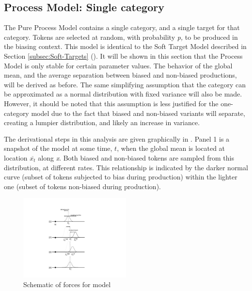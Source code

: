\subsection{\label{subsec:Model-B:-Lengthening}Process Model: Single category}

The Pure Process Model contains a single category, and a single target
for that category. Tokens are selected at random, with probability
\emph{p,} to be produced in the biasing context. This model is identical
to the Soft Target Model described in Section \ref{subsec:Soft-Targets}
(). It will be shown in this
section that the Process Model is only stable for certain parameter
values. The behavior of the global mean, and the average separation
between biased and non-biased productions, will be derived as before.
The same simplifying assumption that the category can be approximated
as a normal distribution with fixed variance will also be made. However,
it should be noted that this assumption is less justified for the
one-category model due to the fact that biased and non-biased variants
will separate, creating a lumpier distribution, and likely an increase
in variance.

The derivational steps in this analysis are given graphically in .
Panel 1 is a snapshot of the model at some
time, \emph{$t$}, when the global mean is located at location $\overline{x_{t}}$
along \emph{x}. Both biased and non-biased tokens are sampled from
this distribution, at different rates. This relationship is indicated
by the darker normal curve (subset of tokens subjected to bias during
production) within the lighter one (subset of tokens non-biased during
production). 

\begin{figure}[h]
\includegraphics[width=0.50\textwidth]{figures/Model1Behavior.pdf}\caption{\label{fig:Derivation}Schematic of forces for  model}
\end{figure}


